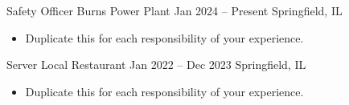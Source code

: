 \eventNode
{Safety Officer}
{Burns Power Plant}
{Jan 2024 -- Present}
{Springfield, IL}
\begin{itemize}
  \item Duplicate this for each responsibility of your experience.
\end{itemize}

\medskip

\eventNode
{Server}
{Local Restaurant}
{Jan 2022 -- Dec 2023}
{Springfield, IL}
\begin{itemize}
  \item Duplicate this for each responsibility of your experience.
\end{itemize}

